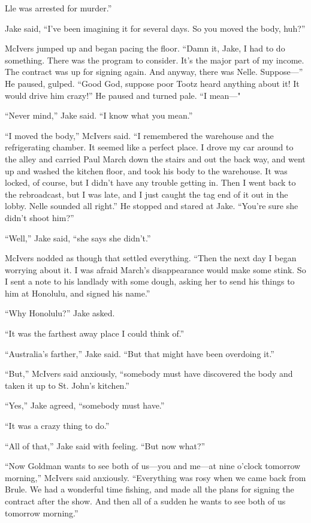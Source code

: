 \documentclass{novel}
\begin{document}
Lle was arrested for murder.”

Jake said, “I’ve been imagining it for several days. So you moved the body, huh?”

McIvers jumped up and began pacing the floor. “Damn it, Jake, I had to do something. There was the program to consider. It’s the major part of my income. The contract was up for signing again. And anyway, there was Nelle. Suppose—” He paused, gulped. “Good God, suppose poor Tootz heard anything about it! It would drive him crazy!” He paused and turned pale. “I mean—"

“Never mind,” Jake said. “I know what you mean.”

“I moved the body,” McIvers said. “I remembered the warehouse and the refrigerating chamber. It seemed like a perfect place. I drove my car around to the alley and carried Paul March down the stairs and out the back way, and went up and washed the kitchen floor, and took his body to the warehouse. It was locked, of course, but I didn’t have any trouble getting in. Then I went back to the rebroadcast, but I was late, and I just caught the tag end of it out in the lobby. Nelle sounded all right.” He stopped and stared at Jake. “You’re sure she didn’t shoot him?”

“Well,” Jake said, “she says she didn’t.”

McIvers nodded as though that settled everything. “Then the next day I began worrying about it. I was afraid March’s disappearance would make some stink. So I sent a note to his landlady with some dough, asking her to send his things to him at Honolulu, and signed his name.”

“Why Honolulu?” Jake asked.

“It was the farthest away place I could think of.”

“Australia’s farther,” Jake said. “But that might have been overdoing it.”

“But,” McIvers said anxiously, “somebody must have discovered the body and taken it up to St. John’s kitchen.”

“Yes,” Jake agreed, “somebody must have.”

“It was a crazy thing to do.”

“All of that,” Jake said with feeling. “But now what?”

“Now Goldman wants to see both of us—you and me—at nine o’clock tomorrow morning,” McIvers said anxiously. “Everything was rosy when we came back from Brule. We had a wonderful time fishing, and made all the plans for signing the contract after the show. And then all of a sudden he wants to see both of us tomorrow morning.”
\end{document}
